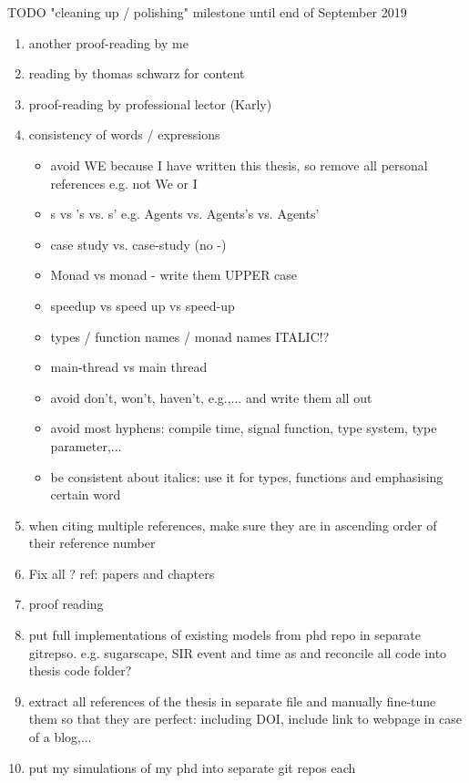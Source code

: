 \documentclass[oneside]{book}
\begin{document}
TODO "cleaning up / polishing" milestone until end of September 2019
\begin{enumerate}
	\item another proof-reading by me	
	
	\item reading by thomas schwarz for content
		
	\item proof-reading by professional lector (Karly)

	\item consistency of words / expressions
		\begin{itemize}
			\item avoid WE because I have written this thesis, so remove all personal references e.g. not We or I
			\item s vs 's vs. s' e.g. Agents vs. Agents's vs. Agents'
			\item case study vs. case-study (no -)
			\item Monad vs monad - write them UPPER case
			\item speedup vs speed up vs speed-up
			\item types / function names / monad names ITALIC!?
			\item main-thread vs main thread
			\item avoid don't, won't, haven't, e.g.,... and write them all out
			\item avoid most hyphens: compile time, signal function, type system, type parameter,...
			\item be consistent about italics: use it for types, functions and emphasising certain word
		\end{itemize}
		
	\item when citing multiple references, make sure they are in ascending order of their reference number
	\item Fix all ? ref: papers and chapters
		
	\item proof reading
	
	\item put full implementations of existing models from phd repo in separate gitrepso. e.g. sugarscape, SIR event and time as and reconcile all code into thesis code folder?
	
	\item extract all references of the thesis in separate file and manually fine-tune them so that they are perfect: including DOI, include link to webpage in case of a blog,...
	
	\item put my simulations of my phd into separate git repos each
\end{enumerate}
\end{document}
